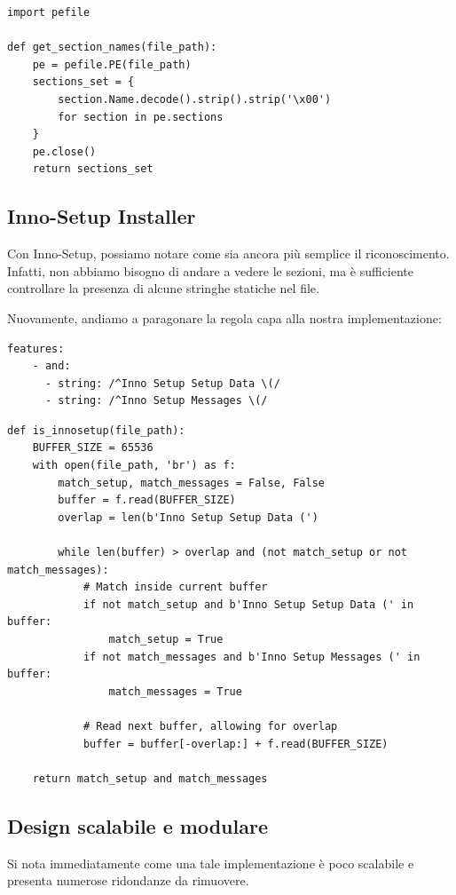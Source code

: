 \begin{verbatim}
import pefile

def get_section_names(file_path):
    pe = pefile.PE(file_path)
    sections_set = {
        section.Name.decode().strip().strip('\x00')
        for section in pe.sections
    }
    pe.close()
    return sections_set
\end{verbatim}

\subsection{Inno-Setup Installer}
Con Inno-Setup, possiamo notare come sia ancora più semplice il riconoscimento. Infatti, non abbiamo bisogno di andare a vedere le sezioni, ma è sufficiente controllare la presenza di alcune stringhe statiche nel file.

Nuovamente, andiamo a paragonare la regola capa alla nostra implementazione:

\begin{verbatim}
features:
    - and:
      - string: /^Inno Setup Setup Data \(/
      - string: /^Inno Setup Messages \(/
\end{verbatim}

\begin{verbatim}
def is_innosetup(file_path):
    BUFFER_SIZE = 65536
    with open(file_path, 'br') as f:
        match_setup, match_messages = False, False
        buffer = f.read(BUFFER_SIZE)
        overlap = len(b'Inno Setup Setup Data (')

        while len(buffer) > overlap and (not match_setup or not match_messages):
            # Match inside current buffer
            if not match_setup and b'Inno Setup Setup Data (' in buffer:
                match_setup = True
            if not match_messages and b'Inno Setup Messages (' in buffer:
                match_messages = True
            
            # Read next buffer, allowing for overlap
            buffer = buffer[-overlap:] + f.read(BUFFER_SIZE)
    
    return match_setup and match_messages
\end{verbatim}

\subsection{Design scalabile e modulare}
Si nota immediatamente come una tale implementazione è poco scalabile e presenta numerose ridondanze da rimuovere.

